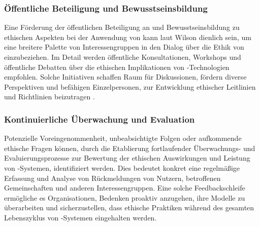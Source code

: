 \documentclass[hidelinks,12pt]{report}
\begin{document}
\subsubsection{Öffentliche Beteiligung und Bewusstseinsbildung}
Eine Förderung der öffentlichen Beteiligung an und Bewusstseinsbildung zu ethischen Aspekten bei der Anwendung von  kann laut Wilson dienlich sein, um eine breitere Palette von Interessengruppen in den Dialog über die Ethik von  einzubeziehen. Im Detail werden öffentliche Konsultationen, Workshops und öffentliche Debatten über die ethischen Implikationen von -Technologien empfohlen. Solche Initiativen schaffen Raum für Diskussionen, fördern diverse Perspektiven und befähigen Einzelpersonen, zur Entwicklung ethischer Leitlinien und Richtlinien beizutragen \cite{WILSON2022101652}.

\newpage

\subsubsection{Kontinuierliche Überwachung und Evaluation}
Potenzielle Voreingenommenheit, unbeabsichtigte Folgen oder aufkommende ethische Fragen können, durch die Etablierung fortlaufender Überwachungs- und Evaluierungsprozesse zur Bewertung der ethischen Auswirkungen und Leistung von -Systemen, identifiziert werden. Dies bedeutet konkret eine regelmäßige Erfassung und Analyse von Rückmeldungen von Nutzern, betroffenen Gemeinschaften und anderen Interessengruppen. Eine solche Feedbackschleife ermögliche es Organisationen, Bedenken proaktiv anzugehen, ihre Modelle zu überarbeiten und sicherzustellen, dass ethische Praktiken während des gesamten Lebenszyklus von -Systemen eingehalten werden.
\\
\end{document}
